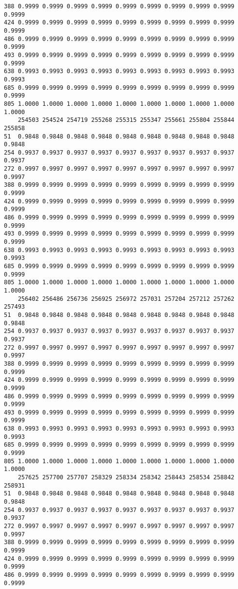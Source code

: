 \documentclass[
]{report}
\begin{document}
\begin{verbatim}
388 0.9999 0.9999 0.9999 0.9999 0.9999 0.9999 0.9999 0.9999 0.9999 0.9999
424 0.9999 0.9999 0.9999 0.9999 0.9999 0.9999 0.9999 0.9999 0.9999 0.9999
486 0.9999 0.9999 0.9999 0.9999 0.9999 0.9999 0.9999 0.9999 0.9999 0.9999
493 0.9999 0.9999 0.9999 0.9999 0.9999 0.9999 0.9999 0.9999 0.9999 0.9999
638 0.9993 0.9993 0.9993 0.9993 0.9993 0.9993 0.9993 0.9993 0.9993 0.9993
685 0.9999 0.9999 0.9999 0.9999 0.9999 0.9999 0.9999 0.9999 0.9999 0.9999
805 1.0000 1.0000 1.0000 1.0000 1.0000 1.0000 1.0000 1.0000 1.0000 1.0000
    254503 254524 254719 255268 255315 255347 255661 255804 255844 255858
51  0.9848 0.9848 0.9848 0.9848 0.9848 0.9848 0.9848 0.9848 0.9848 0.9848
254 0.9937 0.9937 0.9937 0.9937 0.9937 0.9937 0.9937 0.9937 0.9937 0.9937
272 0.9997 0.9997 0.9997 0.9997 0.9997 0.9997 0.9997 0.9997 0.9997 0.9997
388 0.9999 0.9999 0.9999 0.9999 0.9999 0.9999 0.9999 0.9999 0.9999 0.9999
424 0.9999 0.9999 0.9999 0.9999 0.9999 0.9999 0.9999 0.9999 0.9999 0.9999
486 0.9999 0.9999 0.9999 0.9999 0.9999 0.9999 0.9999 0.9999 0.9999 0.9999
493 0.9999 0.9999 0.9999 0.9999 0.9999 0.9999 0.9999 0.9999 0.9999 0.9999
638 0.9993 0.9993 0.9993 0.9993 0.9993 0.9993 0.9993 0.9993 0.9993 0.9993
685 0.9999 0.9999 0.9999 0.9999 0.9999 0.9999 0.9999 0.9999 0.9999 0.9999
805 1.0000 1.0000 1.0000 1.0000 1.0000 1.0000 1.0000 1.0000 1.0000 1.0000
    256402 256486 256736 256925 256972 257031 257204 257212 257262 257493
51  0.9848 0.9848 0.9848 0.9848 0.9848 0.9848 0.9848 0.9848 0.9848 0.9848
254 0.9937 0.9937 0.9937 0.9937 0.9937 0.9937 0.9937 0.9937 0.9937 0.9937
272 0.9997 0.9997 0.9997 0.9997 0.9997 0.9997 0.9997 0.9997 0.9997 0.9997
388 0.9999 0.9999 0.9999 0.9999 0.9999 0.9999 0.9999 0.9999 0.9999 0.9999
424 0.9999 0.9999 0.9999 0.9999 0.9999 0.9999 0.9999 0.9999 0.9999 0.9999
486 0.9999 0.9999 0.9999 0.9999 0.9999 0.9999 0.9999 0.9999 0.9999 0.9999
493 0.9999 0.9999 0.9999 0.9999 0.9999 0.9999 0.9999 0.9999 0.9999 0.9999
638 0.9993 0.9993 0.9993 0.9993 0.9993 0.9993 0.9993 0.9993 0.9993 0.9993
685 0.9999 0.9999 0.9999 0.9999 0.9999 0.9999 0.9999 0.9999 0.9999 0.9999
805 1.0000 1.0000 1.0000 1.0000 1.0000 1.0000 1.0000 1.0000 1.0000 1.0000
    257625 257700 257707 258329 258334 258342 258443 258534 258842 258931
51  0.9848 0.9848 0.9848 0.9848 0.9848 0.9848 0.9848 0.9848 0.9848 0.9848
254 0.9937 0.9937 0.9937 0.9937 0.9937 0.9937 0.9937 0.9937 0.9937 0.9937
272 0.9997 0.9997 0.9997 0.9997 0.9997 0.9997 0.9997 0.9997 0.9997 0.9997
388 0.9999 0.9999 0.9999 0.9999 0.9999 0.9999 0.9999 0.9999 0.9999 0.9999
424 0.9999 0.9999 0.9999 0.9999 0.9999 0.9999 0.9999 0.9999 0.9999 0.9999
486 0.9999 0.9999 0.9999 0.9999 0.9999 0.9999 0.9999 0.9999 0.9999 0.9999

\end{verbatim}
\end{document}
